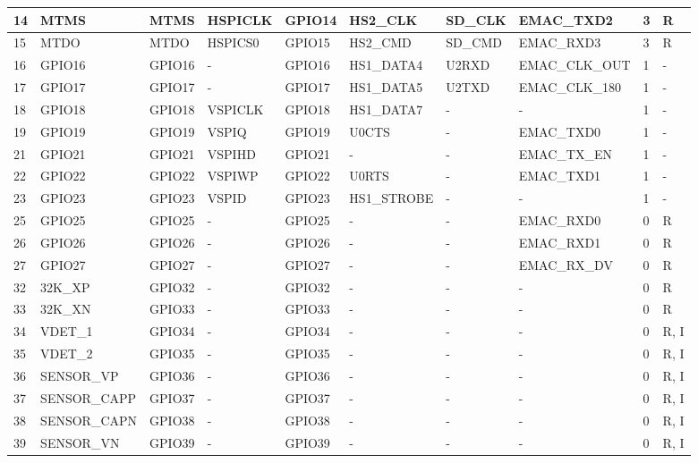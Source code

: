 \begin{longtable}[c]{|p{0.55cm}|p{1.8cm}|p{1.4cm}|p{1.4cm}|p{1.4cm}|p{1.6cm}|p{1.4cm}|p{2.0cm}|p{0.55cm}|p{0.55cm}| }
\hline
14 & MTMS     & MTMS     & HSPICLK  & GPIO14   & HS2\_CLK & SD\_CLK  & EMAC\_TXD2 & 3 & R \\
\hline
15 & MTDO     & MTDO     & HSPICS0  & GPIO15   & HS2\_CMD & SD\_CMD  & EMAC\_RXD3 & 3 & R \\
\hline
16 & GPIO16   & GPIO16   & -        & GPIO16   & HS1\_DATA4 & U2RXD    & EMAC\_CLK\_OUT & 1 & - \\
\hline
17 & GPIO17   & GPIO17   & -        & GPIO17   & HS1\_DATA5 & U2TXD    & EMAC\_CLK\_180 & 1 & - \\
\hline
18 & GPIO18   & GPIO18   & VSPICLK  & GPIO18   & HS1\_DATA7 & -        & -        & 1 & - \\
\hline
19 & GPIO19   & GPIO19   & VSPIQ    & GPIO19   & U0CTS    & -        & EMAC\_TXD0 & 1 & - \\
\hline
21 & GPIO21   & GPIO21   & VSPIHD   & GPIO21   & -        & -        & EMAC\_TX\_EN & 1 & - \\
\hline
22 & GPIO22   & GPIO22   & VSPIWP   & GPIO22   & U0RTS    & -        & EMAC\_TXD1 & 1 & - \\
\hline
23 & GPIO23   & GPIO23   & VSPID    & GPIO23   & HS1\_STROBE & -        & -        & 1 & - \\
\hline
25 & GPIO25   & GPIO25   & -        & GPIO25   & -        & -        & EMAC\_RXD0 & 0 & R \\
\hline
26 & GPIO26   & GPIO26   & -        & GPIO26   & -        & -        & EMAC\_RXD1 & 0 & R \\
\hline
27 & GPIO27   & GPIO27   & -        & GPIO27   & -        & -        & EMAC\_RX\_DV & 0 & R \\
\hline
32 & 32K\_XP  & GPIO32   & -        & GPIO32   & -        & -        & -        & 0 & R \\
\hline
33 & 32K\_XN  & GPIO33   & -        & GPIO33   & -        & -        & -        & 0 & R \\
\hline
34 & VDET\_1  & GPIO34   & -        & GPIO34   & -        & -        & -        & 0 & R, I \\
\hline
35 & VDET\_2  & GPIO35   & -        & GPIO35   & -        & -        & -        & 0 & R, I \\
\hline
36 & SENSOR\_VP & GPIO36   & -        & GPIO36   & -        & -        & -        & 0 & R, I \\
\hline
37 & SENSOR\_CAPP & GPIO37   & -        & GPIO37   & -        & -        & -        & 0 & R, I \\
\hline
38 & SENSOR\_CAPN & GPIO38   & -        & GPIO38   & -        & -        & -        & 0 & R, I \\
\hline
39 & SENSOR\_VN & GPIO39   & -        & GPIO39   & -        & -        & -        & 0 & R, I \\
\hline
    \end{longtable}
\normalsize
